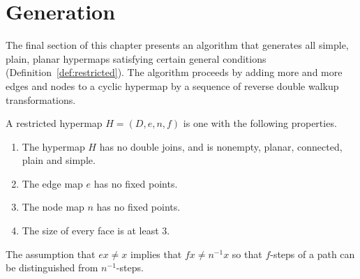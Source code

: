 %

\section{Generation}
%


The final section of this chapter presents an algorithm that generates all
simple, plain, planar hypermaps satisfying certain general conditions
(Definition~\ref{def:restricted}).  The algorithm proceeds by adding more and
more
edges and nodes to a cyclic hypermap by a sequence of reverse double walkup
transformations.

\begin{definition}[restricted]\label{def:restricted}
A restricted hypermap $H = (D,e,n,f)$ is one with the following
properties.
\begin{enumerate}
\item The hypermap $H$ has no double joins, and is nonempty, planar,
  connected, plain and simple.
\item The edge map $e$ has no fixed points.  %
\item The node map $n$ has no fixed points.
\item The size of every face is at least $3$.
\end{enumerate}
%
%
\end{definition}

\begin{remark}
The assumption that $e x \ne x$ implies that $f x \ne n^{-1} x$ so that $f$-steps of a 
path can be distinguished from $n^{-1}$-steps.
\end{remark}


